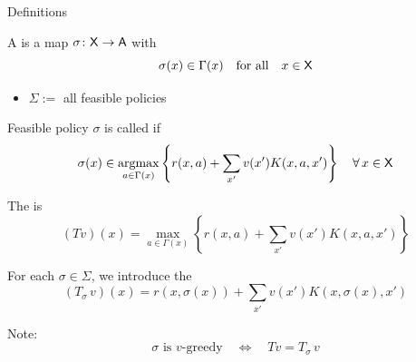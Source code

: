 \documentclass[dvipsnames]{beamer}
\begin{document}
\begin{frame}{Definitions}

    A  is a map $\sigma \colon \mathsf X \to \mathsf A$ with
    \begin{equation*}
        \sigma(x) \in \Gamma(x)
        \quad \text{for all} \quad
        x \in \mathsf X
    \end{equation*}

    \begin{itemize}
        \item $\Sigma := $ all feasible policies
    \end{itemize}


    \vspace{0.5em}
    \vspace{0.5em}
    \vspace{0.5em}
    \vspace{0.5em}

    Feasible policy $\sigma$ is called  if
    \begin{equation*}
        \sigma(x) \in             
        \argmax_{a \in \Gamma(x)}
        \left\{
            r(x, a)
            + 
            \sum_{x'} v(x') K(x, a, x')
        \right\}
        \quad \forall \, x \in \Xsf
    \end{equation*}

\end{frame}




\begin{frame}
    

    \vspace{0.5em}
    The  is
    \begin{equation*}
        (Tv)(x)
            = \max_{a \in \Gamma(x)}
            \left\{
                r(x, a)
                + \sum_{x'} v(x') K(x, a, x')
            \right\}
    \end{equation*}

    \vspace{0.5em}
    \vspace{0.5em}
    For each $\sigma \in \Sigma$, we introduce the  
    \begin{equation*}
        (T_\sigma \, v)(x) 
            = r(x, \sigma(x))
            + \sum_{x'} v(x') K(x, \sigma(x), x')
    \end{equation*}


    \vspace{0.5em}
    \vspace{0.5em}

    Note:
    \begin{equation*}
        \sigma \text{ is $v$-greedy}
        \quad \iff \quad
        Tv = T_\sigma \, v
    \end{equation*}

\end{frame}
\end{document}
